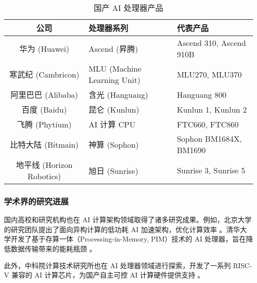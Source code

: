 \begin{table}
    \centering
    \caption{国产 AI 处理器产品}
    \label{tab:ai_chips_1}
    \begin{tabular}{cll} %
      \toprule
      公司   & 处理器系列                                       & 代表产品                          \\
      \midrule
      {华为 (Huawei)} & Ascend (昇腾) & Ascend 310, Ascend 910B \\ 
      {寒武纪 (Cambricon)} & MLU (Machine Learning Unit) & MLU270, MLU370 \\ 
      {阿里巴巴 (Alibaba)} & 含光 (Hanguang) & Hanguang 800 \\ 
      {百度 (Baidu)} & 昆仑 (Kunlun) & Kunlun 1, Kunlun 2 \\ 
      {飞腾 (Phytium)} & AI 计算 CPU & FTC660, FTC860 \\ 
      {比特大陆 (Bitmain)} & 神算 (Sophon) & Sophon BM1684X, BM1690 \\ 
      {地平线 (Horizon Robotics)} & 旭日 (Sunrise) & Sunrise 3, Sunrise 5 \\ 
 
      \bottomrule
    \end{tabular}
\end{table}

\subsubsection{学术界的研究进展}

国内高校和研究机构也在 AI 计算架构领域取得了诸多研究成果。例如，北京大学的研究团队提出了面向异构计算的低功耗 AI 加速架构，优化计算效率 \cite{li2022pku}。清华大学开发了基于存算一体（Processing-in-Memory, PIM）技术的 AI 处理器，旨在降低数据传输带来的能耗瓶颈 \cite{zhang2023pim}。

此外，中科院计算技术研究所也在 AI 处理器领域进行探索，开发了一系列 RISC-V 兼容的 AI 计算芯片，为国产自主可控 AI 计算硬件提供支持 \cite{casic2022riscv}。



